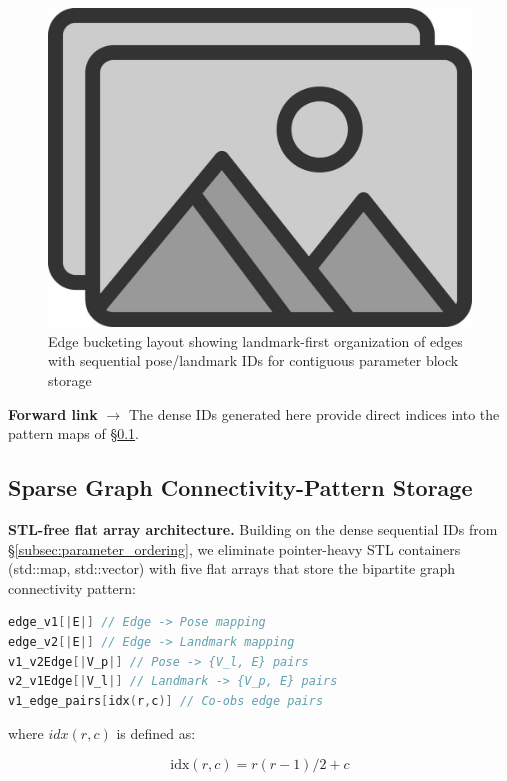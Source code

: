 \begin{figure}[t]
  \centering
  \includegraphics[width=0.75\linewidth]{figs/placeholder}
  \caption{Edge bucketing layout showing landmark-first organization of edges with sequential 
  pose/landmark IDs for contiguous parameter block storage}
  \label{fig:dense_layout}
\end{figure}

\textbf{Forward link} $\rightarrow$ The dense IDs generated here provide direct indices into the pattern maps of
 \S\ref{subsec:connectivity_storage}.

\subsection{Sparse Graph Connectivity-Pattern Storage}
\label{subsec:connectivity_storage}

\textbf{STL-free flat array architecture.} Building on the dense sequential IDs from \S\ref{subsec:parameter_ordering}, 
we eliminate pointer-heavy STL containers (std::map, std::vector) with five flat arrays that store the 
bipartite graph connectivity pattern:

\begin{lstlisting}[language=C++, basicstyle=\ttfamily\small]
edge_v1[|E|] // Edge -> Pose mapping
edge_v2[|E|] // Edge -> Landmark mapping  
v1_v2Edge[|V_p|] // Pose -> {V_l, E} pairs
v2_v1Edge[|V_l|] // Landmark -> {V_p, E} pairs
v1_edge_pairs[idx(r,c)] // Co-obs edge pairs
\end{lstlisting}

where $idx(r,c)$ is defined as:

\begin{equation}
  \text{idx}(r,c) = r(r-1)/2 + c
  \label{eq:closed_form}
\end{equation}


